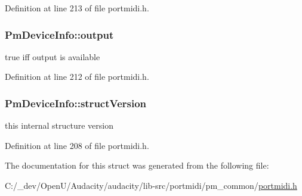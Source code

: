 Definition at line 213 of file portmidi.\+h.

\subsubsection[{\texorpdfstring{output}{output}}]{ Pm\+Device\+Info\+::output}\hypertarget{struct_pm_device_info_a0e395068e4eee637cc576541884d7e69}{}\label{struct_pm_device_info_a0e395068e4eee637cc576541884d7e69}
true iff output is available 

Definition at line 212 of file portmidi.\+h.

\subsubsection[{\texorpdfstring{struct\+Version}{structVersion}}]{ Pm\+Device\+Info\+::struct\+Version}\hypertarget{struct_pm_device_info_ab2b405d77d62c45105703d8b25177665}{}\label{struct_pm_device_info_ab2b405d77d62c45105703d8b25177665}
this internal structure version 

Definition at line 208 of file portmidi.\+h.



The documentation for this struct was generated from the following file\+:\begin{DoxyCompactItemize}
\item 
C\+:/\+\_\+dev/\+Open\+U/\+Audacity/audacity/lib-\/src/portmidi/pm\+\_\+common/\hyperlink{portmidi_8h}{portmidi.\+h}\end{DoxyCompactItemize}
